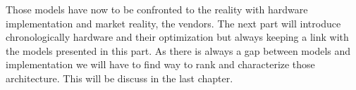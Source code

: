 Those models have now to be confronted to the reality with hardware implementation and market reality, the vendors. 
The next part will introduce chronologically hardware and their optimization but always keeping a link with the models presented in this part. 
As there is always a gap between models and implementation we will have to find way to rank and characterize those architecture. 
This will be discuss in the last chapter. 
